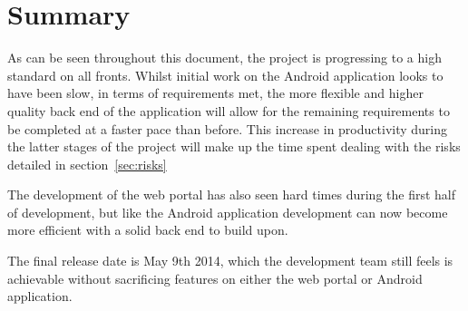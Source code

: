 \documentclass[11pt,a4paper]{article}
\begin{document}
\section{Summary}
\label{sec:summary}
As can be seen throughout this document, the project is progressing to a high standard on all fronts. Whilst initial work on the Android application looks to have been slow, in terms of requirements met, the more flexible and higher quality back end of the application will allow for the remaining requirements to be completed at a faster pace than before. This increase in productivity during the latter stages of the project will make up the time spent dealing with the risks detailed in section~\ref{sec:risks}

The development of the web portal has also seen hard times during the first half of development, but like the Android application development can now become more efficient with a solid back end to build upon.

The final release date is May 9th 2014, which the development team still feels is achievable without sacrificing features on either the web portal or Android application.
\end{document}

